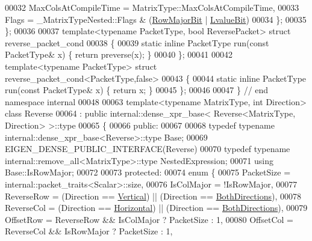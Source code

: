 \begin{DoxyCode}
00032     MaxColsAtCompileTime = MatrixType::MaxColsAtCompileTime,
00033     Flags = \_MatrixTypeNested::Flags & (\hyperlink{group__flags_gae4f56c2a60bbe4bd2e44c5b19cbe8762}{RowMajorBit} | \hyperlink{group__flags_gae2c323957f20dfdc6cb8f44428eaec1a}{LvalueBit})
00034   \};
00035 \};
00036 
00037 \textcolor{keyword}{template}<\textcolor{keyword}{typename} PacketType, \textcolor{keywordtype}{bool} ReversePacket> \textcolor{keyword}{struct }reverse\_packet\_cond
00038 \{
00039   \textcolor{keyword}{static} \textcolor{keyword}{inline} PacketType run(\textcolor{keyword}{const} PacketType& x) \{ \textcolor{keywordflow}{return} preverse(x); \}
00040 \};
00041 
00042 \textcolor{keyword}{template}<\textcolor{keyword}{typename} PacketType> \textcolor{keyword}{struct }reverse\_packet\_cond<PacketType,false>
00043 \{
00044   \textcolor{keyword}{static} \textcolor{keyword}{inline} PacketType run(\textcolor{keyword}{const} PacketType& x) \{ \textcolor{keywordflow}{return} x; \}
00045 \};
00046 
00047 \} \textcolor{comment}{// end namespace internal }
00048 
00063 \textcolor{keyword}{template}<\textcolor{keyword}{typename} MatrixType, \textcolor{keywordtype}{int} Direction> \textcolor{keyword}{class }Reverse
00064   : \textcolor{keyword}{public} internal::dense\_xpr\_base< Reverse<MatrixType, Direction> >::type
00065 \{
00066   \textcolor{keyword}{public}:
00067 
00068     \textcolor{keyword}{typedef} \textcolor{keyword}{typename} internal::dense\_xpr\_base<Reverse>::type Base;
00069     EIGEN\_DENSE\_PUBLIC\_INTERFACE(Reverse)
00070     \textcolor{keyword}{typedef} \textcolor{keyword}{typename} internal::remove\_all<MatrixType>::type NestedExpression;
00071     \textcolor{keyword}{using} Base::IsRowMajor;
00072 
00073   \textcolor{keyword}{protected}:
00074     \textcolor{keyword}{enum} \{
00075       PacketSize = internal::packet\_traits<Scalar>::size,
00076       IsColMajor = !IsRowMajor,
00077       ReverseRow = (Direction == \hyperlink{group__enums_ggad49a7b3738e273eb00932271b36127f7addca718e0564723df21d61b94b1198be}{Vertical})   || (Direction == 
      \hyperlink{group__enums_ggad49a7b3738e273eb00932271b36127f7aa01e40fce022901560ce6d9fdee2fde3}{BothDirections}),
00078       ReverseCol = (Direction == \hyperlink{group__enums_ggad49a7b3738e273eb00932271b36127f7aae8a16b3b9272683c1162915f6d892be}{Horizontal}) || (Direction == 
      \hyperlink{group__enums_ggad49a7b3738e273eb00932271b36127f7aa01e40fce022901560ce6d9fdee2fde3}{BothDirections}),
00079       OffsetRow  = ReverseRow && IsColMajor ? PacketSize : 1,
00080       OffsetCol  = ReverseCol && IsRowMajor ? PacketSize : 1,

\end{DoxyCode}
